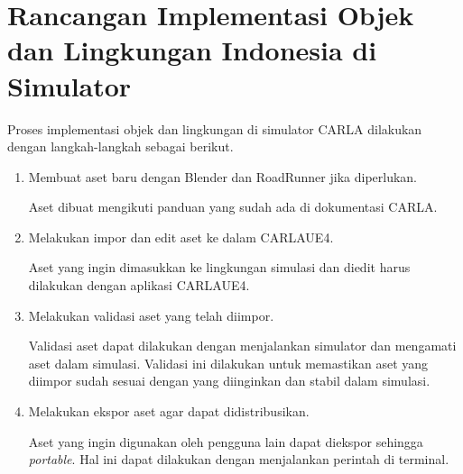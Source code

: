 \section{Rancangan Implementasi Objek dan Lingkungan Indonesia di Simulator}
Proses implementasi objek dan lingkungan di simulator CARLA dilakukan dengan
langkah-langkah sebagai berikut.
\begin{enumerate}
	\item Membuat aset baru dengan Blender dan RoadRunner jika diperlukan.

	Aset dibuat mengikuti panduan yang sudah ada di dokumentasi CARLA.

	\item Melakukan impor dan edit aset ke dalam CARLAUE4.

	Aset yang ingin dimasukkan ke lingkungan simulasi dan diedit harus dilakukan
	dengan aplikasi CARLAUE4.



	\item Melakukan validasi aset yang telah diimpor.

	Validasi aset dapat dilakukan dengan menjalankan simulator dan mengamati
	aset dalam simulasi. Validasi ini dilakukan untuk memastikan aset yang
	diimpor sudah sesuai dengan yang diinginkan dan stabil dalam simulasi.

	\item Melakukan ekspor aset agar dapat didistribusikan.

	Aset yang ingin digunakan oleh pengguna lain dapat diekspor sehingga
	\textit{portable}. Hal ini dapat dilakukan dengan menjalankan perintah di
	terminal.

\end{enumerate}

